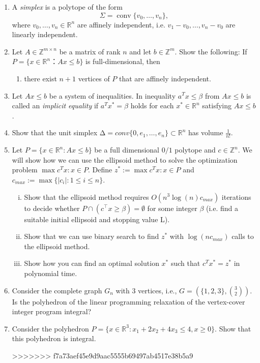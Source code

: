 \documentclass[11pt]{article}
\institute{\'Ecole Polytechnique F\'ed\'erale de Lausanne}
\DeclareMathOperator{\conv}{conv}
\newcommand{\setR}{\mathbb{R}}
\newcommand{\setZ}{\mathbb{Z}}
\begin{document}
\makeheader

\begin{enumerate}[1)]

\item A \emph{simplex}  is a polytope of the form
  \begin{displaymath}
    Σ = \conv\{v_0,\dots,v_n\}, 
    \end{displaymath}
    where $v_0,\dots,v_n ∈ ℝ^n$ are affinely independent, i.e. $v_1-v_0, \dots,v_n - v_0$ are linearly independent.

    
\item Let $A ∈ ℤ^{m ×n}$ be a matrix of rank $n$ and let $b ∈ ℤ^m$. Show the following: If $P = \{ x ∈ ℝ^n ： Ax ≤ b\}$ is full-dimensional, then
  \begin{enumerate}
  \item   there exist $n+1$ vertices of $P$ that are affinely independent. 
  \end{enumerate}
\item Let $Ax ≤b$ be a system of inequalities.  %
  In inequality $a^T x ≤ β$ from $Ax ≤b$ is called an \emph{implicit equality} if
    $a^T x^*  = β$ holds for each $x^* ∈ ℝ^n$ satisfying $Ax ≤b$. %

  

\item Show that the unit simplex $∆ = conv\{0,e_1,\hdots,e_n\}⊂\setR^n$ has volume $\frac{1}{n!}$.



\item Let $P= \{x∈\setR^n : Ax≤b\}$ be a full dimensional $0/1$ polytope and $c ∈\setZ^n$. We will show how we
can use the ellipsoid method to solve the optimization problem $\max c^Tx: x∈P$.
Define $z^*:= \max c^Tx: x∈P$ and $c_{max} := \max \{|c_i|: 1 ≤i≤n\}$.
\begin{enumerate}[i)]
\item Show that the ellipsoid method requires $O(n^3 \log(n)c_{max})$ iterations to decide whether $P ∩
(c^⊤x≥β) = ∅$ for some integer $β$ (i.e. find a suitable initial ellipsoid and stopping value L).
\item Show that we can use binary search to find $z^*$ with $\log(nc_{max})$ calls to the ellipsoid method.
\item Show how you can find an optimal solution $x^*$ such that $c^Tx^*= z^*$ in polynomial time.
\end{enumerate}



\item Consider the complete graph $G_n$ with 3 vertices, i.e., $G= (\{1,2,3\}, \binom{3}
{2} )$. Is the polyhedron of the linear programming relaxation of the vertex-cover integer program integral?


\item Consider the polyhedron $P = \{x ∈ \setR^3 : x_1 + 2 x_2 + 4 x_3 ≤ 4, x ≥ 0\}$. Show that this polyhedron is integral. 



>>>>>>> f7a73aef45e9d9aac5555b69497ab4517e38b5a9
\end{enumerate}




  
\end{document}
